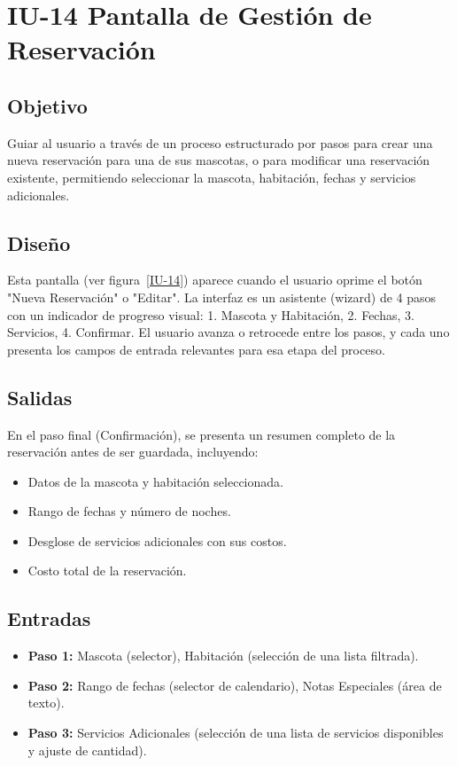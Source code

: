 \section{IU-14 Pantalla de Gestión de Reservación}

\subsection{Objetivo}
    Guiar al usuario a través de un proceso estructurado por pasos para crear una nueva reservación para una de sus mascotas, o para modificar una reservación existente, permitiendo seleccionar la mascota, habitación, fechas y servicios adicionales.

\subsection{Diseño}
    Esta pantalla  (ver figura~\ref{IU-14}) aparece cuando el usuario oprime el botón "Nueva Reservación" o "Editar". La interfaz es un asistente (wizard) de 4 pasos con un indicador de progreso visual: 1. Mascota y Habitación, 2. Fechas, 3. Servicios, 4. Confirmar. El usuario avanza o retrocede entre los pasos, y cada uno presenta los campos de entrada relevantes para esa etapa del proceso.

\subsection{Salidas}
    En el paso final (Confirmación), se presenta un resumen completo de la reservación antes de ser guardada, incluyendo:
    \begin{itemize}
        \item Datos de la mascota y habitación seleccionada.
        \item Rango de fechas y número de noches.
        \item Desglose de servicios adicionales con sus costos.
        \item Costo total de la reservación.
    \end{itemize}

\subsection{Entradas}
\begin{itemize}
    \item \textbf{Paso 1:} Mascota (selector), Habitación (selección de una lista filtrada).
    \item \textbf{Paso 2:} Rango de fechas (selector de calendario), Notas Especiales (área de texto).
    \item \textbf{Paso 3:} Servicios Adicionales (selección de una lista de servicios disponibles y ajuste de cantidad).
\end{itemize}

